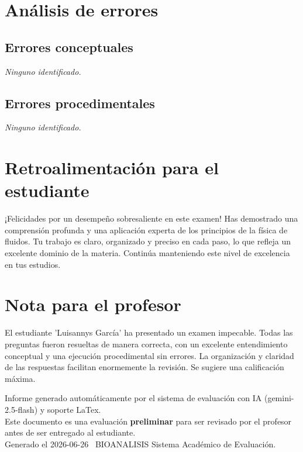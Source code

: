 \documentclass[11pt,a4paper]{article}
\begin{document}
\section*{Análisis de errores}

\subsection*{Errores conceptuales}
\textit{Ninguno identificado.}

\subsection*{Errores procedimentales}
\textit{Ninguno identificado.}

\section*{Retroalimentación para el estudiante}
\begin{tcolorbox}[cajaRecomendacion, title={Dirigido a: luisannys garcia 33141963}]
¡Felicidades por un desempeño sobresaliente en este examen! Has demostrado una comprensión profunda y una aplicación experta de los principios de la física de fluidos. Tu trabajo es claro, organizado y preciso en cada paso, lo que refleja un excelente dominio de la materia. Continúa manteniendo este nivel de excelencia en tus estudios.
\end{tcolorbox}

\section*{Nota para el profesor}
\begin{tcolorbox}[
  enhanced, breakable,
  colback=yellow!8, colframe=yellow!60!black,
  fonttitle=\bfseries, coltitle=black,
  title={Observaciones para revisión manual},
  top=4pt, bottom=4pt, left=8pt, right=8pt,
]
El estudiante 'Luisannys García' ha presentado un examen impecable. Todas las preguntas fueron resueltas de manera correcta, con un excelente entendimiento conceptual y una ejecución procedimental sin errores. La organización y claridad de las respuestas facilitan enormemente la revisión. Se sugiere una calificación máxima.
\end{tcolorbox}

\vspace{12pt}
\begin{center}
  \footnotesize\color{gray}
  Informe generado automáticamente por el sistema de evaluación con IA (gemini-2.5-flash) y soporte LaTex. \\
  Este documento es una evaluación \textbf{preliminar} para ser revisado por el profesor antes de ser entregado al 
  estudiante. \\
  Generado el 2026-06-26 \textbullet\ BIOANALISIS Sistema Académico de Evaluación.
  \end{center}
\end{document}
